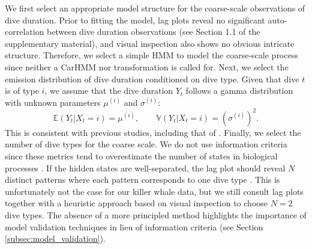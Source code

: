 We first select an appropriate model structure for the coarse-scale observations of dive duration. Prior to fitting the model, lag plots reveal no significant auto-correlation between dive duration observations (see Section 1.1 of the supplementary material), and visual inspection also shows no obvious intricate structure. Therefore, we select a simple HMM to model the coarse-scale process since neither a CarHMM nor transformation is called for.
%
Next, we select the emission distribution of dive duration conditioned on dive type. Given that dive $t$ is of type $i$, we assume that the dive duration $Y_t$ follows
a gamma distribution with unknown parameters $\mu^{(i)}$ and $\sigma^{(i)}$:
%
$$\mathbb{E}(Y_t|X_t = i) = \mu^{(i)}, \qquad \mathbb{V}(Y_t|X_t = i) = \left(\sigma^{(i)}\right)^2.$$
%
This is consistent with previous studies, including that of \citet{Barajas:2017}. 
%
Finally, we select the number of dive types for the coarse scale. We do not use information criteria since these metrics tend to overestimate the number of states in biological processes \citep{Pohle:2017}. If the hidden states are well-separated, the lag plot should reveal $N$ distinct patterns where each pattern corresponds to one dive type \citep{Lawler:2019}. This is unfortunately not the case for our killer whale data, but we still consult lag plots together with a heuristic approach based on visual inspection to choose $N = 2$ dive types. The absence of a more principled method highlights the importance of model validation techniques in lieu of information criteria (see Section \ref{subsec:model_validation}).


